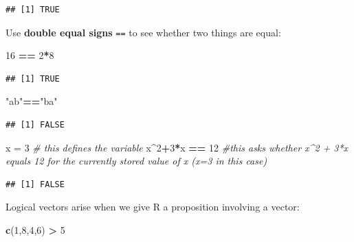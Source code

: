 \documentclass[
]{book}
\newenvironment{Shaded}{\begin{snugshade}}{\end{snugshade}}
\newcommand{\CommentTok}[1]{\textcolor[rgb]{0.56,0.35,0.01}{\textit{#1}}}
\newcommand{\DecValTok}[1]{\textcolor[rgb]{0.00,0.00,0.81}{#1}}
\newcommand{\FunctionTok}[1]{\textcolor[rgb]{0.13,0.29,0.53}{\textbf{#1}}}
\newcommand{\NormalTok}[1]{#1}
\newcommand{\OtherTok}[1]{\textcolor[rgb]{0.56,0.35,0.01}{#1}}
\newcommand{\SpecialCharTok}[1]{\textcolor[rgb]{0.81,0.36,0.00}{\textbf{#1}}}
\newcommand{\StringTok}[1]{\textcolor[rgb]{0.31,0.60,0.02}{#1}}
\theoremstyle{definition}
\theoremstyle{definition}
\theoremstyle{definition}
\theoremstyle{definition}
\theoremstyle{remark}
\begin{document}
\begin{verbatim}
## [1] TRUE
\end{verbatim}

Use \textbf{double equal signs} \texttt{==} to see whether two things are equal:

\begin{Shaded}
\begin{Highlighting}[]
\DecValTok{16} \SpecialCharTok{==} \DecValTok{2}\SpecialCharTok{*}\DecValTok{8}
\end{Highlighting}
\end{Shaded}

\begin{verbatim}
## [1] TRUE
\end{verbatim}

\begin{Shaded}
\begin{Highlighting}[]
\StringTok{"ab"}\SpecialCharTok{==}\StringTok{"ba"}
\end{Highlighting}
\end{Shaded}

\begin{verbatim}
## [1] FALSE
\end{verbatim}

\begin{Shaded}
\begin{Highlighting}[]
\NormalTok{x }\OtherTok{=} \DecValTok{3} \CommentTok{\# this defines the variable}
\NormalTok{x}\SpecialCharTok{\^{}}\DecValTok{2}\SpecialCharTok{+}\DecValTok{3}\SpecialCharTok{*}\NormalTok{x }\SpecialCharTok{==} \DecValTok{12} \CommentTok{\#this asks whether x\^{}2 + 3*x equals 12 for the currently stored value of x (x=3 in this case)}
\end{Highlighting}
\end{Shaded}

\begin{verbatim}
## [1] FALSE
\end{verbatim}

Logical vectors arise when we give R a proposition involving a vector:

\begin{Shaded}
\begin{Highlighting}[]
\FunctionTok{c}\NormalTok{(}\DecValTok{1}\NormalTok{,}\DecValTok{8}\NormalTok{,}\DecValTok{4}\NormalTok{,}\DecValTok{6}\NormalTok{) }\SpecialCharTok{\textgreater{}} \DecValTok{5}
\end{Highlighting}
\end{Shaded}
\end{document}
